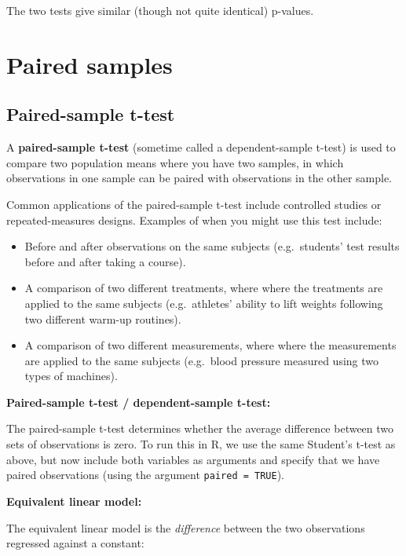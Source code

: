 \documentclass[
  12pt,
]{krantz}
\providecommand{\tightlist}{%
  \setlength{\itemsep}{0pt}\setlength{\parskip}{0pt}}
\begin{document}
The two tests give similar (though not quite identical) p-values.

\hypertarget{paired-samples}{%
\section{Paired samples}\label{paired-samples}}

\hypertarget{paired-sample-t-test}{%
\subsection{Paired-sample t-test}\label{paired-sample-t-test}}

A \textbf{paired-sample t-test} (sometime called a dependent-sample t-test) is used to compare two population means where you have two samples, in which observations in one sample can be paired with observations in the other sample.

Common applications of the paired-sample t-test include controlled studies or repeated-measures designs. Examples of when you might use this test include:

\begin{itemize}
\tightlist
\item
  Before and after observations on the same subjects (e.g.~students' test
  results before and after taking a course).
\item
  A comparison of two different treatments, where where the treatments are applied to the same subjects (e.g.~athletes' ability to lift weights following two different warm-up routines).
\item
  A comparison of two different measurements, where where the measurements are applied to the same subjects (e.g.~blood pressure measured using two types of machines).
\end{itemize}

\textbf{Paired-sample t-test / dependent-sample t-test:}

The paired-sample t-test determines whether the average difference between two sets of observations is zero. To run this in R, we use the same Student's t-test as above, but now include both variables as arguments and specify that we have paired observations (using the argument \texttt{paired\ =\ TRUE}).

\textbf{Equivalent linear model:}

The equivalent linear model is the \emph{difference} between the two observations regressed against a constant:
\end{document}
